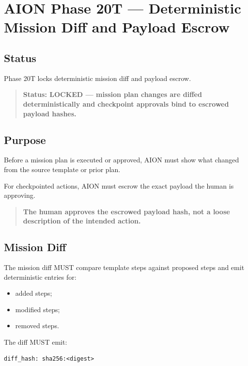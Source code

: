 \section{AION Phase 20T --- Deterministic Mission Diff and Payload Escrow}
\label{sec:aion-phase20t-mission-diff-payload-escrow}

\subsection{Status}

Phase 20T locks deterministic mission diff and payload escrow.

\begin{quote}
\textbf{Status: LOCKED --- mission plan changes are diffed deterministically and checkpoint approvals bind to escrowed payload hashes.}
\end{quote}

\subsection{Purpose}

Before a mission plan is executed or approved, AION must show what changed from the source template or prior plan.

For checkpointed actions, AION must escrow the exact payload the human is approving.

\begin{quote}
\textbf{The human approves the escrowed payload hash, not a loose description of the intended action.}
\end{quote}

\subsection{Mission Diff}

The mission diff MUST compare template steps against proposed steps and emit deterministic entries for:

\begin{itemize}
  \item added steps;
  \item modified steps;
  \item removed steps.
\end{itemize}

The diff MUST emit:

\begin{verbatim}
diff_hash: sha256:<digest>
\end{verbatim}

